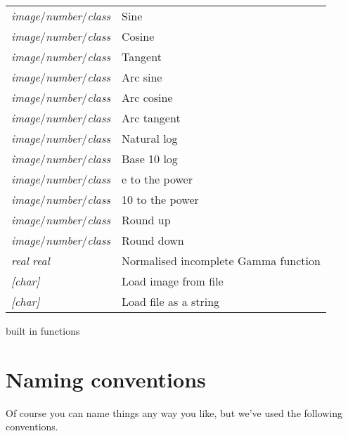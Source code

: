 \begin{tab2}
\begin{center}
\begin{tabular}{||l|l||}
\ct{sin} \textit{image}/\textit{number}/\textit{class} & 
				Sine \\
\ct{cos} \textit{image}/\textit{number}/\textit{class} & 
				Cosine \\
\ct{tan} \textit{image}/\textit{number}/\textit{class} & 
				Tangent \\
\ct{asin} \textit{image}/\textit{number}/\textit{class} & 
				Arc sine \\
\ct{acos} \textit{image}/\textit{number}/\textit{class} & 
				Arc cosine \\
\ct{atan} \textit{image}/\textit{number}/\textit{class} & 
				Arc tangent \\
\ct{log} \textit{image}/\textit{number}/\textit{class} & 
				Natural log \\
\ct{log10} \textit{image}/\textit{number}/\textit{class} & 
				Base 10 log \\
\ct{exp} \textit{image}/\textit{number}/\textit{class} & 
				e to the power \\
\ct{exp10} \textit{image}/\textit{number}/\textit{class} & 
				10 to the power \\
\ct{ceil} \textit{image}/\textit{number}/\textit{class} & 
				Round up \\
\ct{floor} \textit{image}/\textit{number}/\textit{class} & 
				Round down \\
\ct{gammq} \textit{real} \textit{real} & 
				Normalised incomplete Gamma function \\
\hline
\ct{vips\_image} \textit{[char]}& Load image from file \\
\ct{read} \textit{[char]}	& Load file as a string \\
\hline
\end{tabular}
\end{center}
\caption{\nip{} built in functions}
\end{tab2}

\section{Naming conventions}

Of course you can name things any way you like, but we've used the following
conventions.

